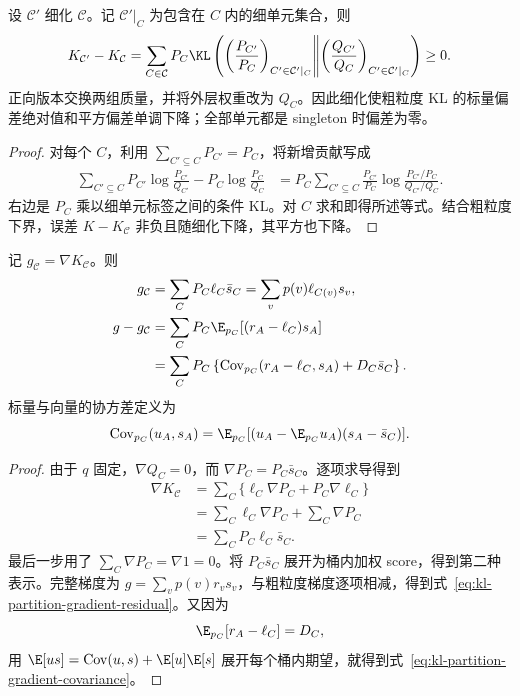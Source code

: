 \begin{proposition}[分区细化的标量单调性]
\label{prop:kl-partition-refinement}
设 $\mathcal C'$ 细化 $\mathcal C$。记 $\mathcal C'|_C$ 为包含在 $C$ 内的细单元集合，则
\[
 K_{\mathcal C'}-K_{\mathcal C}
 =\sum_{C\in\mathcal C}P_C
   \KL\left(
       \left(\frac{P_{C'}}{P_C}\right)_{C'\in\mathcal C'|_C}
       \middle\Vert
       \left(\frac{Q_{C'}}{Q_C}\right)_{C'\in\mathcal C'|_C}
      \right)\geq0.
\]
正向版本交换两组质量，并将外层权重改为 $Q_C$。因此细化使粗粒度 KL 的标量偏差绝对值和平方偏差单调下降；全部单元都是 singleton 时偏差为零。
\end{proposition}

\begin{proof}
对每个 $C$，利用 $\sum_{C'\subseteq C}P_{C'}=P_C$，将新增贡献写成
\begin{align*}
 \sum_{C'\subseteq C}P_{C'}\log\frac{P_{C'}}{Q_{C'}}
    -P_C\log\frac{P_C}{Q_C}
 &=P_C\sum_{C'\subseteq C}\frac{P_{C'}}{P_C}
       \log\frac{P_{C'}/P_C}{Q_{C'}/Q_C}.
\end{align*}
右边是 $P_C$ 乘以细单元标签之间的条件 KL。对 $C$ 求和即得所述等式。结合粗粒度下界，误差 $K-K_{\mathcal C}$ 非负且随细化下降，其平方也下降。
\end{proof}

\begin{theorem}
\label{thm:kl-partition-gradient}
记 $g_{\mathcal C}=\nabla K_{\mathcal C}$。则
\begin{align}
 g_{\mathcal C}
 &=\sum_CP_C\ell_C\bar s_C
  =\sum_vp(v)\ell_{C(v)}s_v,
 \label{eq:kl-partition-gradient}\\
 g-g_{\mathcal C}
 &=\sum_CP_C\E_{p_C}[(r_A-\ell_C)s_A]
 \label{eq:kl-partition-gradient-residual}\\
 &=\sum_CP_C\left\{
       \operatorname{Cov}_{p_C}(r_A-\ell_C,s_A)
       +D_C\bar s_C\right\}.
 \label{eq:kl-partition-gradient-covariance}
\end{align}
标量与向量的协方差定义为
\[
 \operatorname{Cov}_{p_C}(u_A,s_A)
 =\E_{p_C}[(u_A-\E_{p_C}u_A)(s_A-\bar s_C)].
\]
\end{theorem}

\begin{proof}
由于 $q$ 固定，$\nabla Q_C=0$，而 $\nabla P_C=P_C\bar s_C$。逐项求导得到
\begin{align*}
 \nabla K_{\mathcal C}
 &=\sum_C\{\ell_C\nabla P_C+P_C\nabla\ell_C\}\\
 &=\sum_C\ell_C\nabla P_C+\sum_C\nabla P_C\\
 &=\sum_CP_C\ell_C\bar s_C.
\end{align*}
最后一步用了 $\sum_C\nabla P_C=\nabla1=0$。将 $P_C\bar s_C$ 展开为桶内加权 score，得到第二种表示。完整梯度为 $g=\sum_vp(v)r_vs_v$，与粗粒度梯度逐项相减，得到式~\eqref{eq:kl-partition-gradient-residual}。又因为
\[
 \E_{p_C}[r_A-\ell_C]=D_C,
\]
用 $\E[us]=\operatorname{Cov}(u,s)+\E[u]\E[s]$ 展开每个桶内期望，就得到式~\eqref{eq:kl-partition-gradient-covariance}。
\end{proof}

